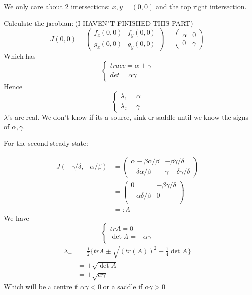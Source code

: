 \documentclass{/home/janmebows/Documents/LatexTemplates/myassignment}
\begin{document}
\begin{figure}[h]
\centering
{}
\end{figure}
We only care about 2 intersections: $x,y = (0,0)$ and the top right intersection.

Calculate the jacobian:
(I HAVEN"T FINISHED THIS PART)
\[J(0,0) = \begin{pmatrix}
    f_x(0,0)& f_y(0,0)\\
    g_x(0,0)&g_y(0,0)
\end{pmatrix} = \begin{pmatrix}
    \alpha&0\\ 0&\gamma
\end{pmatrix}\]
Which has 
\[\begin{cases}
    trace = \alpha + \gamma\\
    det = \alpha\gamma
\end{cases}\]
Hence 
\[\begin{cases}
    \lambda_1 = \alpha \\
    \lambda_2 = \gamma
\end{cases}\]
$\lambda$'s are real. We don't know if its a source, sink or saddle until we know the signs of $\alpha,\gamma$.


For the second steady state:

\begin{align*}
    J(-\gamma/\delta, -\alpha/\beta) &= \begin{pmatrix}
        \alpha - \beta \alpha/\beta & -\beta \gamma/\delta\\
        -\delta \alpha/\beta & \gamma - \delta \gamma/\delta
    \end{pmatrix}\\
    &= \begin{pmatrix}
        0 & -\beta \gamma/\delta\\
        - \alpha \delta/\beta & 0 \\
    \end{pmatrix}\\
    &=: A
\end{align*}
We have
\[\begin{cases}
    tr A = 0\\
    \det A = - \alpha \gamma
\end{cases}\]
\begin{align*}
    \lambda_{\pm} &= \frac12\{trA \pm \sqrt{(tr(A))^2 - \frac14 \det A}\}\\
    &=\pm \sqrt{\det A}\\
    &= \pm \sqrt{\alpha \gamma}
\end{align*}
Which will be a centre if $\alpha\gamma < 0$ or a saddle if $\alpha\gamma >0$
\end{document}
